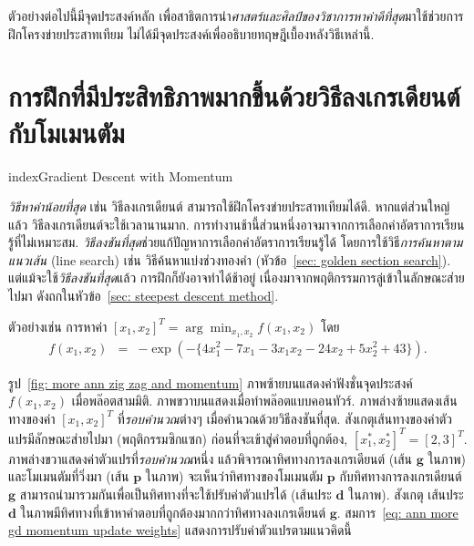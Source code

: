 ตัวอย่างต่อไปนี้มีจุดประสงค์หลัก 
เพื่อสาธิตการนำ\textit{ศาสตร์และศิลป์ของวิชาการหาค่าดีที่สุด}มาใช้ช่วยการฝึกโครงข่ายประสาทเทียม 
ไม่ได้มีจุดประสงค์เพื่ออธิบายทฤษฎีเบื้องหลังวิธีเหล่านี้.

\section{การฝึกที่มีประสิทธิภาพมากขึ้นด้วยวิธีลงเกรเดียนต์กับโมเมนตัม}
\label{sec: GDM example}
index{Gradient Descent with Momentum}

\textit{วิธีหาค่าน้อยที่สุด} เช่น วิธีลงเกรเดียนต์ สามารถใช้ฝึกโครงข่ายประสาทเทียมได้ดี.
หากแต่ส่วนใหญ่แล้ว วิธีลงเกรเดียนต์จะใช้เวลานานมาก.
การทำงานช้านี้ส่วนหนึ่งอาจมาจากการเลือกค่าอัตราการเรียนรู้ที่ไม่เหมาะสม.
\textit{วิธีลงชันที่สุด}ช่วยแก้ปัญหาการเลือกค่าอัตราการเรียนรู้ได้ โดยการใช้วิธี\textit{การค้นหาตามแนวเส้น} (line search) เช่น วิธีค้นหาแบ่งช่วงทองคำ (หัวข้อ~\ref{sec: golden section search}).
แต่แม้จะใช้\textit{วิธีลงชันที่สุด}แล้ว การฝึกก็ยังอาจทำได้ช้าอยู่%
เนื่องมาจากพฤติกรรมการลู่เข้าในลักษณะส่ายไปมา ดังถกในหัวข้อ~\ref{sec: steepest descent method}.

ตัวอย่างเช่น การหาค่า $[x_1, x_2]^T = \arg \min_{x_1, x_2} f(x_1,x_2)$ โดย
\begin{eqnarray}
f(x_1, x_2) &=& -\exp( - \{ 4 x_1^2 - 7 x_1 - 3 x_1 x_2 -24 x_2 + 5 x_2^2 + 43 \} ).
\label{eq: ann more gdm example}
\end{eqnarray}

รูป~\ref{fig: more ann zig zag and momentum} ภาพซ้ายบนแสดงค่าฟังชั่นจุดประสงค์ $f(x_1,x_2)$ เมื่อพล๊อตสามมิติ.
ภาพขวาบนแสดงเมื่อทำพล๊อตแบบคอนทัวร์.
ภาพล่างซ้ายแสดงเส้นทางของค่า $[x_1, x_2]^T$ ที่\textit{รอบคำนวณ}ต่างๆ เมื่อคำนวณด้วยวิธีลงชันที่สุด.
สังเกตุเส้นทางของค่าตัวแปรมีลักษณะส่ายไปมา (พฤติกรรมซิกแซก) ก่อนที่จะเข้าสู่คำตอบที่ถูกต้อง, $[x_1^*, x_2^*]^T = [2,3]^T$.
ภาพล่างขวาแสดงค่าตัวแปรที่\textit{รอบคำนวณ}หนึ่ง แล้วพิจารณาทิศทางการลงเกรเดียนต์ (เส้น $\mathbf{g}$ ในภาพ) และโมเมนตัมที่วิ่งมา (เส้น $\mathbf{p}$ ในภาพ) 
จะเห็นว่าทิศทางของโมเมนตัม $\mathbf{p}$ กับทิศทางการลงเกรเดียนต์ $\mathbf{g}$ สามารถนำมารวมกันเพื่อเป็นทิศทางที่จะใช้ปรับค่าตัวแปรได้ (เส้นประ $\mathbf{d}$ ในภาพ).
สังเกตุ เส้นประ $\mathbf{d}$ ในภาพมีทิศทางที่เข้าหาคำตอบที่ถูกต้องมากกว่าทิศทางลงเกรเดียนต์ $\mathbf{g}$.
สมการ~\ref{eq: ann more gd momentum update weights}  แสดงการปรับค่าตัวแปรตามแนวคิดนี้

